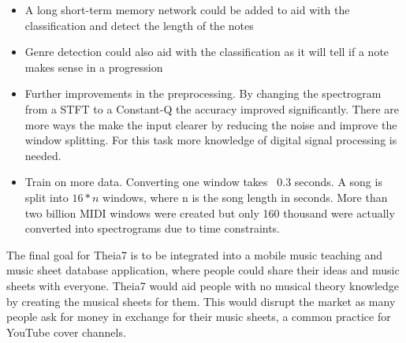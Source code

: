 \begin{itemize}
	\item A long short-term memory network could be added to aid with the classification and detect the length of the notes
	\item Genre detection could also aid with the classification as it will tell if a note makes sense in a progression
	\item Further improvements in the preprocessing. By changing the spectrogram from a STFT to a Constant-Q the accuracy improved significantly. There are more ways the make the input clearer by reducing the noise and improve the window splitting. For this task more knowledge of digital signal processing is needed.
	\item Train on more data. Converting one window takes ~0.3 seconds. A song is split into $16*n$ windows, where n is the song length in seconds. More than two billion MIDI windows were created but only 160 thousand were actually converted into spectrograms due to time constraints.
\end{itemize}

The final goal for Theia7 is to be integrated into a mobile music teaching and music sheet database application, where people could share their ideas and music sheets with everyone. Theia7 would aid people with no musical theory knowledge by creating the musical sheets for them. This would disrupt the market as many people ask for money in exchange for their music sheets, a common practice for YouTube cover channels.